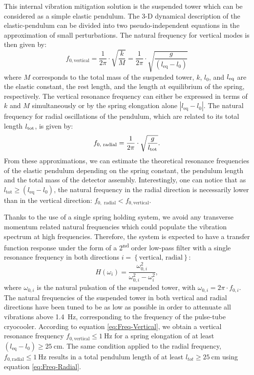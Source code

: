 This internal vibration mitigation solution is the suspended tower which can be considered as a simple elastic pendulum.
The 3-D dynamical description of the elastic-pendulum can be divided into two pseudo-independent equations in the approximation of small perturbations. The natural frequency for vertical modes is then given by:
\begin{equation}
\label{eq:Freq-Vertical}
f_{0,\textrm{vertical}}=\frac{1}{2\pi}\cdot\sqrt{\frac{k}{M}} = \frac{1}{2\pi}\cdot\sqrt{\frac{g}{(l_{\textrm{eq}}-l_{0})}}
\end{equation}
where $M$ corresponds to the total mass of the suspended tower, $k$, $l_0$, and $l_{\rm eq}$ are the elastic constant, the rest length, and the length at equilibrium of the spring, respectively. The vertical resonance frequency can either be expressed in terms of $k$ and $M$ simultaneously or by the spring elongation alone $|l_{\textrm{eq}}-l_{0}|$. The natural frequency for radial oscillations of the pendulum, which are related to its total length  $l_{\rm tot}$, is given by:
\begin{equation}
f_{0,\textrm{ radial}}=\frac{1}{2\pi}\cdot\sqrt{\frac{g}{l_{\rm tot}}}\label{eq:Freq-Radial}.
\end{equation}
From these approximations, we can estimate the theoretical resonance frequencies of the elastic pendulum depending on the spring constant, the pendulum length and the total mass of the detector assembly. Interestingly, one can notice that as $l_{\textrm{tot}} \geq (l_{\textrm{eq}}-l_{0})$, the natural frequency in the radial direction is necessarily lower than in the vertical direction: $f_{0,\textrm{ radial}}<f_{0,\textrm{vertical}}$. 

Thanks to the use of a single spring holding system, we avoid any transverse momentum related natural frequencies which could populate the vibration spectrum at high frequencies. Therefore, the system is expected to have a transfer function response under the form of a 2\textsuperscript{nd} order low-pass filter with a single resonance frequency in both directions $i=\left\{ \textrm{vertical, radial}\right\}$:
\begin{equation}
H(\omega_{i})=\frac{\omega_{0,i}^{2}}{\omega_{0,i}^{2}-\omega_{i}^{2}}\label{eq:Transfer-function},
\end{equation}
where $\omega_{0,i}$ is the natural pulsation of the suspended tower, with $\omega_{0,i}=2\pi\cdot f_{0,i}$. 
The natural frequencies of the suspended tower in both vertical and radial directions have been tuned to be as low as possible in order to attenuate all vibrations above \SI{1.4}{\Hz}, corresponding to the frequency of the pulse-tube cryocooler. According to equation \ref{eq:Freq-Vertical}, we obtain a vertical resonance frequency $f_{0,\textrm{vertical}} \leq \SI{1}{\Hz}$ for a spring elongation of at least $(l_{\textrm{eq}}-l_{0})\geq \SI{25}{\cm}$. The same condition applied to the radial frequency, $f_{0,\textrm{radial}} \leq \SI{1}{\Hz}$ results in a total pendulum length of at least  $l_{tot}\geq \SI{25}{\cm}$ using equation \ref{eq:Freq-Radial}.

